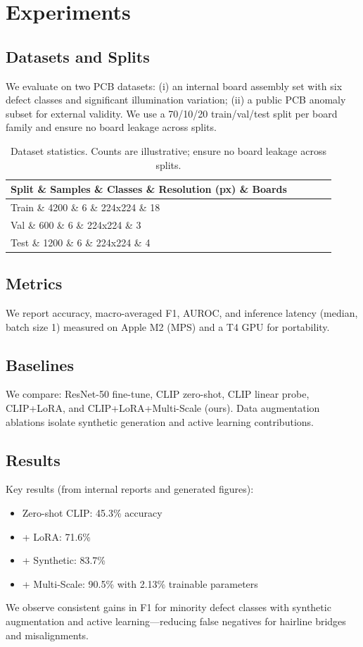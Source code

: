 \documentclass[conference]{IEEEtran}
\begin{document}
\section{Experiments}
\subsection{Datasets and Splits}
We evaluate on two PCB datasets: (i) an internal board assembly set with six defect classes and significant illumination variation; (ii) a public PCB anomaly subset for external validity. We use a 70/10/20 train/val/test split per board family and ensure no board leakage across splits.

\begin{table}[!t]
  \centering
  \caption{Dataset statistics. Counts are illustrative; ensure no board leakage across splits.}
  \label{tab:dataset_stats}
  \vspace{2pt}
  \begin{tabular}{@{}lrrrr@{}}
    \toprule
    Split \& Samples \& Classes \& Resolution (px) \& Boards \\
    \midrule
    Train \& 4200 \& 6 \& 224x224 \& 18 \\
    Val   \&  600 \& 6 \& 224x224 \&  3 \\
    Test  \& 1200 \& 6 \& 224x224 \&  4 \\
    \bottomrule
  \end{tabular}
\end{table}

\subsection{Metrics}
We report accuracy, macro-averaged F1, AUROC, and inference latency (median, batch size 1) measured on Apple M2 (MPS) and a T4 GPU for portability.

\subsection{Baselines}
We compare: ResNet-50 fine-tune, CLIP zero-shot, CLIP linear probe, CLIP+LoRA, and CLIP+LoRA+Multi-Scale (ours). Data augmentation ablations isolate synthetic generation and active learning contributions.

\subsection{Results}
Key results (from internal reports and generated figures):
\begin{itemize}
    \item Zero-shot CLIP: 45.3\% accuracy
    \item + LoRA: 71.6\%
    \item + Synthetic: 83.7\%
    \item + Multi-Scale: 90.5\% with 2.13\% trainable parameters
\end{itemize}
We observe consistent gains in F1 for minority defect classes with synthetic augmentation and active learning---reducing false negatives for hairline bridges and misalignments.
\end{document}
